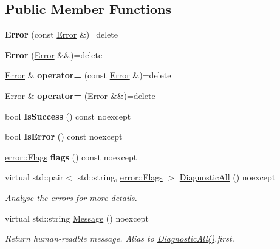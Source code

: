 \subsection*{Public Member Functions}
\begin{DoxyCompactItemize}
\item 
\hypertarget{classae_1_1_error_af8423867a7fddb42a71111b96c92c740}{}\label{classae_1_1_error_af8423867a7fddb42a71111b96c92c740} 
{\bfseries Error} (const \hyperlink{classae_1_1_error}{Error} \&)=delete
\item 
\hypertarget{classae_1_1_error_a60f2301a074178a8b3f8cf6bd37ec395}{}\label{classae_1_1_error_a60f2301a074178a8b3f8cf6bd37ec395} 
{\bfseries Error} (\hyperlink{classae_1_1_error}{Error} \&\&)=delete
\item 
\hypertarget{classae_1_1_error_a26a17a28eaed3d38349191ec5a878572}{}\label{classae_1_1_error_a26a17a28eaed3d38349191ec5a878572} 
\hyperlink{classae_1_1_error}{Error} \& {\bfseries operator=} (const \hyperlink{classae_1_1_error}{Error} \&)=delete
\item 
\hypertarget{classae_1_1_error_a5e800d8b4d0e8bccc14dd5dc815b9a08}{}\label{classae_1_1_error_a5e800d8b4d0e8bccc14dd5dc815b9a08} 
\hyperlink{classae_1_1_error}{Error} \& {\bfseries operator=} (\hyperlink{classae_1_1_error}{Error} \&\&)=delete
\item 
\hypertarget{classae_1_1_error_a5424dd175ff84fcc0dbc2bda1952b939}{}\label{classae_1_1_error_a5424dd175ff84fcc0dbc2bda1952b939} 
bool {\bfseries Is\+Success} () const noexcept
\item 
\hypertarget{classae_1_1_error_a12852602e662db19d5d7f5cc06256c46}{}\label{classae_1_1_error_a12852602e662db19d5d7f5cc06256c46} 
bool {\bfseries Is\+Error} () const noexcept
\item 
\hypertarget{classae_1_1_error_a7dbdfd03e6f6d180d1f0ded4efa10cac}{}\label{classae_1_1_error_a7dbdfd03e6f6d180d1f0ded4efa10cac} 
\hyperlink{structae_1_1error_1_1_flags}{error\+::\+Flags} {\bfseries flags} () const noexcept
\item 
virtual std\+::pair$<$ std\+::string, \hyperlink{structae_1_1error_1_1_flags}{error\+::\+Flags} $>$ \hyperlink{classae_1_1_error_ab6172fe7f6627dd726223bd4bd923693}{Diagnostic\+All} () noexcept
\begin{DoxyCompactList}\small\item\em Analyse the errors for more details. \end{DoxyCompactList}\item 
\hypertarget{classae_1_1_error_a5390c80f9eed13d8b4fce01468395187}{}\label{classae_1_1_error_a5390c80f9eed13d8b4fce01468395187} 
virtual std\+::string \hyperlink{classae_1_1_error_a5390c80f9eed13d8b4fce01468395187}{Message} () noexcept
\begin{DoxyCompactList}\small\item\em Return human-\/readble message. Alias to \hyperlink{classae_1_1_error_ab6172fe7f6627dd726223bd4bd923693}{Diagnostic\+All()}.first. \end{DoxyCompactList}\end{DoxyCompactItemize}
